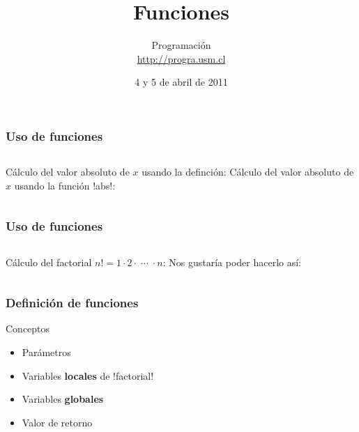 \documentclass[12pt]{beamer}
\title{Funciones}
\author{
  Programación \\ \url{http://progra.usm.cl}
}
\date{4 y 5 de abril de 2011}
\begin{document}
  \begin{frame}
    \maketitle
  \end{frame}

  \begin{frame}
    \frametitle{Uso de funciones}
    \label{uso-funcion-abs}
    \begin{columns}[t]
        Cálculo del valor absoluto de \(x\)
        usando la definción:
        Cálculo del valor absoluto de \(x\)
        usando la función \li!abs!:
    \end{columns}
    \vspace{2ex}
    \begin{columns}[t]
        \footnotesize
        
        \footnotesize
        
    \end{columns}
  \end{frame}

  \begin{frame}
    \frametitle{Uso de funciones}
    \label{uso-funcion-factorial}
    \begin{columns}[t]
        Cálculo del factorial \(n! = 1\cdot 2\cdot\;\cdots\;\cdot n\):
        Nos gustaría
        poder hacerlo así:
    \end{columns}
    \vspace{2ex}
    \begin{columns}[t]
        \footnotesize
        
        \footnotesize
        
    \end{columns}
  \end{frame}

  \begin{frame}
    \frametitle{Definición de funciones}
    \label{def-fn-factorial}
    
  \end{frame}

  \begin{frame}
    \label{conceptos-funciones}
    \begin{block}{Conceptos}
      \begin{itemize}
        \item Parámetros
        \item Variables \textbf{locales} de \li!factorial!
        \item Variables \textbf{globales}
        \item Valor de retorno
      \end{itemize}
    \end{block}
    \footnotesize
    
  \end{frame}
\end{document}
